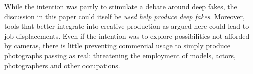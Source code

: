 While the intention was partly to stimulate a debate around deep fakes, the discussion in this paper could itself be \textit{used help produce deep fakes}. Moreover, tools that better integrate into creative production as argued here could lead to job displacements. Even if the intention was to explore possibilities not afforded by cameras, there is little preventing commercial usage to simply produce photographs passing as real: threatening the employment of models, actors, photographers and other occupations. 




